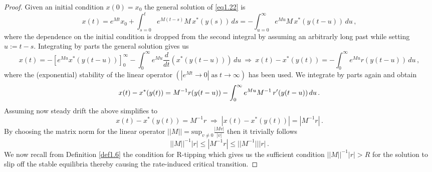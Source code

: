 \documentclass[../main.tex]{subfiles}
\begin{document}
\begin{proof}
     Given an initial condition $x(0)=x_{0}$ the general solution of \eqref{eq1.22} is
     \begin{equation*}
         x(t) = e^{Mt}x_{0}+\int_{s=0}^{t}e^{M(t-s)}M\,x^{*}(y(s))\,ds = - \int_{u=0}^{\infty}e^{Mu}M\,x^{*}(y(t-u))\,du\,,
     \end{equation*}
     where the dependence on the initial condition is dropped from the second integral by assuming an arbitrarly long past while setting $u:=t-s$. Integrating by parts the general solution gives us
     \begin{equation*}
             x(t) = -[e^{Mu}x^{*}(y(t-u))]_{0}^{\infty} - \int_{0}^{\infty}e^{Mu}\frac{d}{dt}(x^{*}(y(t-u)))\,du\:\Rightarrow\: x(t) - x^{*}(y(t)) = -\int_{0}^{\infty}e^{Mu}r(y(t-u))\,du\,,
     \end{equation*}
     where the (exponential) stability of the linear operator $(|e^{Mt}\to0|\;\text{as}\; t\to \infty)$ has been used. We integrate by parts again and obtain 
     \begin{equation*}
         x(t) - x^{*}(y(t)) = M^{-1}r(y(t-u))-\int_{0}^{\infty}e^{Mu}M^{-1}\,r'(y(t-u))\,du\,.
     \end{equation*}
     Assuming now steady drift the above simplifies to
     \begin{equation*}
         x(t) - x^{*}(y(t)) = M^{-1}r\;\Rightarrow\;|x(t) - x^{*}(y(t))| = |M^{-1}r|\,.
     \end{equation*}
     By choosing the matrix norm for the linear operator $||M||=\text{sup}_{v\neq0}\frac{|Mv|}{|v|}$ then it trivially follows
     \begin{equation*}
         ||M||^{-1}|r|\leq|M^{-1}r|\leq||M^{-1}|||r|\,.
     \end{equation*}
     We now recall from Definition \ref{def1.6} the condition for R-tipping which gives us the sufficient condition $||M||^{-1}|r|>R$ for the solution to slip off the stable equilibria thereby causing the rate-induced critical transition. 
\end{proof}
\end{document}
